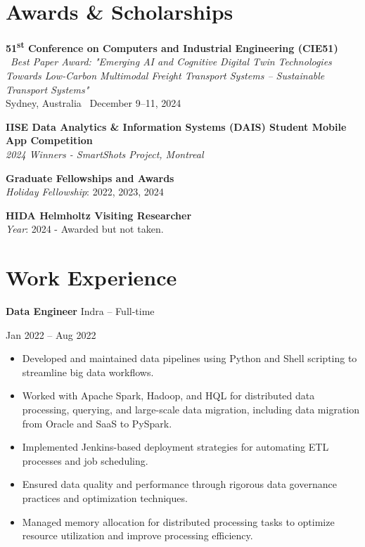 \documentclass[10pt, letterpaper]{article}
\newenvironment{highlights}{
    \begin{itemize}[
        topsep=0.10 cm,
        parsep=0.10 cm,
        partopsep=0pt,
        itemsep=0pt,
        leftmargin=0 cm + 10pt
    ]
}{
    \end{itemize}
} %
\newenvironment{twocolentry}[2][]{
    \onecolentry
    \def\secondColumn{#2}
    \setcolumnwidth{\fill, 4.5 cm}
    \begin{paracol}{2}
}{
    \switchcolumn \raggedleft \secondColumn
    \end{paracol}
    \endonecolentry
} %
\begin{document}
        \section*{Awards \& Scholarships}


        \noindent \textbf{51\textsuperscript{st} Conference on Computers and Industrial Engineering (CIE51)} \ \textit{Best Paper Award: "Emerging AI and Cognitive Digital Twin Technologies Towards Low-Carbon Multimodal Freight Transport Systems – Sustainable Transport Systems"} \\ Sydney, Australia \  December 9–11, 2024 \
        \vspace{0.5em}


        \noindent \textbf{IISE Data Analytics \& Information Systems (DAIS) Student Mobile App Competition} \\
        \textit{2024 Winners - SmartShots Project, Montreal} \\
        
        
        \vspace{0.5em} %
        
        \noindent \textbf{Graduate Fellowships and Awards} \\
        \textit{Holiday Fellowship}: 2022, 2023, 2024 \\
        
        \vspace{0.5em} %
        
        \noindent \textbf{HIDA Helmholtz Visiting Researcher} \\
        \textit{Year}: 2024 - Awarded but not taken.

        
\section*{Work Experience}

\begin{twocolentry}{Jan 2022 – Aug 2022}
    \textbf{Data Engineer} \textbar Indra – Full-time
\end{twocolentry}
\begin{highlights}
    \item Developed and maintained data pipelines using Python and Shell scripting to streamline big data workflows.
    \item Worked with Apache Spark, Hadoop, and HQL for distributed data processing, querying, and large-scale data migration, including data migration from Oracle and SaaS to PySpark.
    \item Implemented Jenkins-based deployment strategies for automating ETL processes and job scheduling.
    \item Ensured data quality and performance through rigorous data governance practices and optimization techniques.
    \item Managed memory allocation for distributed processing tasks to optimize resource utilization and improve processing efficiency.
\end{highlights}
\end{document}
